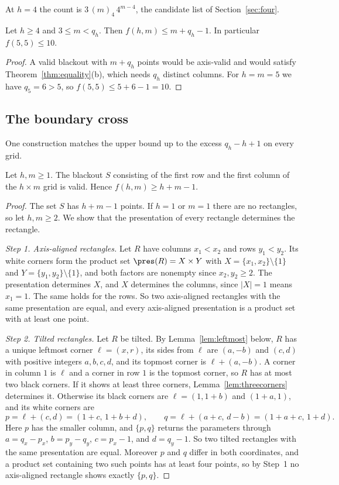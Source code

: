 At $h=4$ the count is $3\,(m)_4\,4^{m-4}$, the candidate list of Section~\ref{sec:four}.

\begin{corollary}\label{cor:small-m}
Let $h\ge4$ and $3\le m<q_h$. Then $f(h,m)\le m+q_h-1$. In particular $f(5,5)\le10$.
\end{corollary}

\begin{proof}
A valid blackout with $m+q_h$ points would be axis-valid and would satisfy Theorem~\ref{thm:equality}(b), which needs $q_h$ distinct columns. For $h=m=5$ we have $q_5=6>5$, so $f(5,5)\le5+6-1=10$.
\end{proof}

\subsection{The boundary cross}

One construction matches the upper bound up to the excess $q_h-h+1$ on every grid.

\begin{lemma}\label{lem:cross}
Let $h,m\ge1$. The blackout $S$ consisting of the first row and the first column of the $h\times m$ grid is valid. Hence $f(h,m)\ge h+m-1$.
\end{lemma}

\begin{proof}
The set $S$ has $h+m-1$ points. If $h=1$ or $m=1$ there are no rectangles, so let $h,m\ge2$. We show that the presentation of every rectangle determines the rectangle.

\emph{Step 1. Axis-aligned rectangles.} Let $R$ have columns $x_1<x_2$ and rows $y_1<y_2$. Its white corners form the product set $\pres(R)=X\times Y$ with $X=\{x_1,x_2\}\setminus\{1\}$ and $Y=\{y_1,y_2\}\setminus\{1\}$, and both factors are nonempty since $x_2,y_2\ge2$. The presentation determines $X$, and $X$ determines the columns, since $|X|=1$ means $x_1=1$. The same holds for the rows. So two axis-aligned rectangles with the same presentation are equal, and every axis-aligned presentation is a product set with at least one point.

\emph{Step 2. Tilted rectangles.} Let $R$ be tilted. By Lemma~\ref{lem:leftmost} below, $R$ has a unique leftmost corner $\ell=(x,r)$, its sides from $\ell$ are $(a,-b)$ and $(c,d)$ with positive integers $a,b,c,d$, and its topmost corner is $\ell+(a,-b)$. A corner in column $1$ is $\ell$ and a corner in row $1$ is the topmost corner, so $R$ has at most two black corners. If it shows at least three corners, Lemma~\ref{lem:threecorners} determines it. Otherwise its black corners are $\ell=(1,1+b)$ and $(1+a,1)$, and its white corners are
\[
p=\ell+(c,d)=(1+c,\,1+b+d),\qquad q=\ell+(a+c,\,d-b)=(1+a+c,\,1+d).
\]
Here $p$ has the smaller column, and $\{p,q\}$ returns the parameters through $a=q_x-p_x$, $b=p_y-q_y$, $c=p_x-1$, and $d=q_y-1$. So two tilted rectangles with the same presentation are equal. Moreover $p$ and $q$ differ in both coordinates, and a product set containing two such points has at least four points, so by Step~1 no axis-aligned rectangle shows exactly $\{p,q\}$.
\end{proof}

